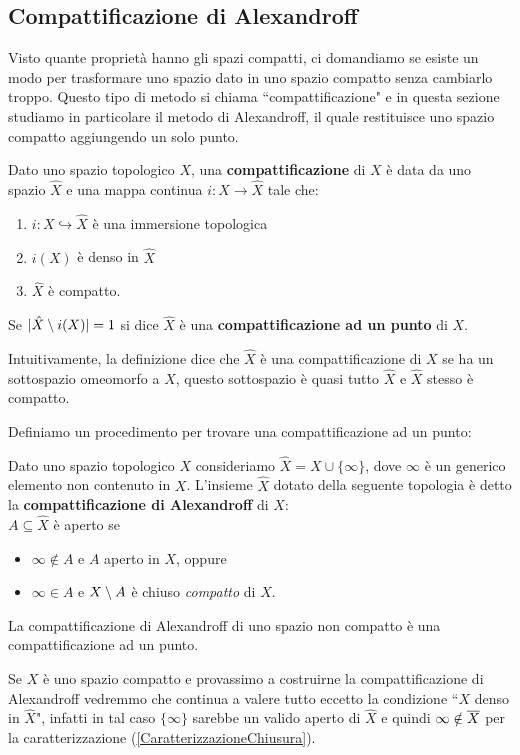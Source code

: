 \begin{multicols*}{2}
\subsection{Compattificazione di Alexandroff}
Visto quante proprietà hanno gli spazi compatti, ci domandiamo se esiste un modo per trasformare uno spazio dato in uno spazio compatto senza cambiarlo troppo. Questo tipo di metodo si chiama ``compattificazione" e in questa sezione studiamo in particolare il metodo di Alexandroff, il quale restituisce uno spazio compatto aggiungendo un solo punto.
\begin{definition}[Compattificazione]
Dato uno spazio topologico $X$, una \textbf{compattificazione} di $X$ è data da uno spazio $\hat X$ e una mappa continua $i:X\to \hat X$ tale che:
\begin{enumerate}[noitemsep]
\item $i:X\hookrightarrow \hat X$ è una immersione topologica
\item $i(X)$ è denso in $\hat X$
\item $\hat X$ è compatto.
\end{enumerate}
Se $|\hat X\setminus i(X)|=1$ si dice $\hat X$ è una \textbf{compattificazione ad un punto} di $X$.
\end{definition}
\begin{remark}
Intuitivamente, la definizione dice che $\hat X$ è una compattificazione di $X$ se ha un sottospazio omeomorfo a $X$, questo sottospazio è quasi tutto $\hat X$ e $\hat X$ stesso è compatto.
\end{remark}
\noindent
Definiamo un procedimento per trovare una compattificazione ad un punto:

\begin{definition}
Dato uno spazio topologico $X$ consideriamo $\hat X=X\cup\{\infty\}$, dove $\infty$ è un generico elemento non contenuto in $X$. L'insieme $\hat X$ dotato della seguente topologia è detto la \textbf{compattificazione di Alexandroff} di $X$:\\
$A\subseteq \hat X$ è aperto se
\begin{itemize}[noitemsep]
\item $\infty\notin A$ e  $A$ aperto in $X$, oppure
\item $\infty \in A$ e $X\setminus A$ è chiuso \emph{compatto} di $X$.
\end{itemize}
\end{definition}
\begin{theorem}
La compattificazione di Alexandroff di uno spazio non compatto è una compattificazione ad un punto.
\end{theorem}
\begin{remark}
Se $X$ è uno spazio compatto e provassimo a costruirne la compattificazione di Alexandroff vedremmo che continua a valere tutto eccetto la condizione ``$X$ denso in $\hat X$", infatti in tal caso $\{\infty\}$ sarebbe un valido aperto di $\hat X$ e quindi $\infty\notin\overline{X}$ per la caratterizzazione (\ref{CaratterizzazioneChiusura}).
\end{remark}


\end{multicols*}
